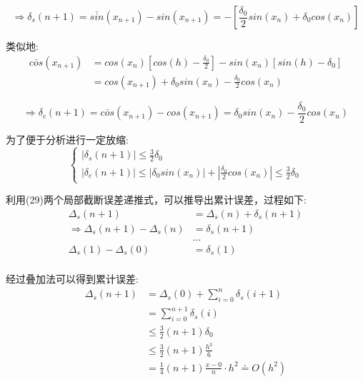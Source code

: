 \documentclass[UTF8]{ctexart}
\begin{document}
\begin{equation}
    \Rightarrow \delta_s(n+1) = \bar{sin}(x_{n+1})-sin(x_{n+1}) = - [\frac{\delta_0}{2}sin(x_n)+\delta_0 cos(x_n)]
\end{equation}

类似地:
\begin{equation}
    \begin{aligned}
        \bar{cos}(x_{n+1}) &= cos(x_n)[cos(h)-\frac{\delta_0}{2}] - sin(x_n)[sin(h) - \delta_0]\\
        &= cos(x_{n+1}) + \delta_0sin(x_n)-\frac{\delta_0}{2}cos(x_n)
    \end{aligned}
\end{equation}

\begin{equation}
    \Rightarrow \delta_c(n+1) = \bar{cos}(x_{n+1})-cos(x_{n+1}) = \delta_0sin(x_n)-\frac{\delta_0}{2}cos(x_n)
\end{equation}

为了便于分析进行一定放缩:
\begin{equation}
    \begin{cases}
        |\delta_s(n+1)| \leq \frac{3}{2}\delta_0 \\
        |\delta_c(n+1)| \leq |\delta_0 sin(x_n)| + |\frac{\delta_0}{2}cos(x_n)| \leq \frac{3}{2}\delta_0
    \end{cases}
\end{equation}

利用(29)两个局部截断误差递推式，可以推导出累计误差，过程如下:
\begin{equation}
    \begin{aligned}
        \Delta_s(n+1) &= \Delta_s(n) + \delta_s(n+1) \\
        \Rightarrow \Delta_s(n+1) - \Delta_s(n) &= \delta_s(n+1)\\
        &\dots\\
        \Delta_s(1) - \Delta_s(0) &= \delta_s(1)\\
    \end{aligned}
\end{equation}

经过叠加法可以得到累计误差:
\begin{equation}
    \begin{aligned}
        \Delta_s(n+1) &= \Delta_s(0) + \sum_{i=0}^{n}\delta_s(i+1)\\
        &= \sum_{i=0}^{n+1}\delta_s(i)\\
        &\leq \frac{3}{2}(n+1)\delta_0 \\
        &\leq \frac{3}{2}(n+1)\frac{h^3}{6}\\
        &= \frac{1}{4}(n+1)\frac{x-0}{n} \cdot h^2
        \doteq O(h^2)
    \end{aligned}
\end{equation}
\end{document}
